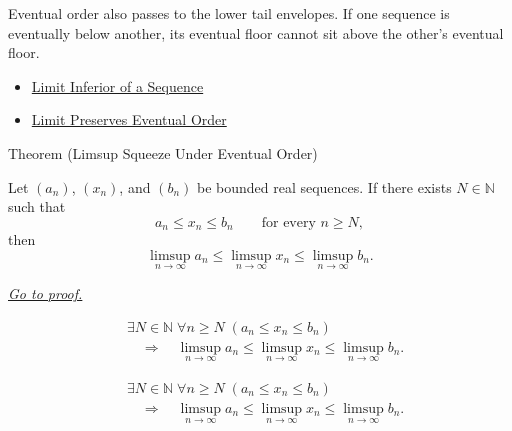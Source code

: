 \begin{remark*}[Interpretation]
Eventual order also passes to the lower tail envelopes. If one sequence is
eventually below another, its eventual floor cannot sit above the other's
eventual floor.
\end{remark*}

\begin{dependencies}
\begin{itemize}
  \item \hyperref[def:liminf-sequence]{Limit Inferior of a Sequence}
  \item \hyperref[thm:limit-preserves-eventual-order]{Limit Preserves Eventual Order}
\end{itemize}
\end{dependencies}


\begin{theorembox}{Theorem (Limsup Squeeze Under Eventual Order)}
\begin{theorem}
\label{thm:limsup-squeeze-under-eventual-order}
Let $(a_n)$, $(x_n)$, and $(b_n)$ be bounded real sequences. If there
exists $N\in\mathbb{N}$ such that
\[
  a_n\le x_n\le b_n
  \qquad\text{for every }n\ge N,
\]
then
\[
  \limsup_{n\to\infty}a_n
  \le
  \limsup_{n\to\infty}x_n
  \le
  \limsup_{n\to\infty}b_n.
\]

\smallskip
\noindent
\hyperref[prf:limsup-squeeze-under-eventual-order]{\textit{Go to proof.}}
\end{theorem}
\end{theorembox}

\begin{remark*}
\[
\begin{aligned}
&\exists N\in\mathbb{N}\;\forall n\ge N\;(a_n\le x_n\le b_n)\\
&\quad\Longrightarrow\quad
\limsup_{n\to\infty}a_n
\le
\limsup_{n\to\infty}x_n
\le
\limsup_{n\to\infty}b_n.
\end{aligned}
\]
\end{remark*}

\begin{remark*}
\[
\begin{aligned}
&\exists N\in\mathbb{N}\;\forall n\ge N\;(a_n\le x_n\le b_n)\\
&\quad\Longrightarrow\quad
\limsup_{n\to\infty}a_n
\le
\limsup_{n\to\infty}x_n
\le
\limsup_{n\to\infty}b_n.
\end{aligned}
\]
\end{remark*}

